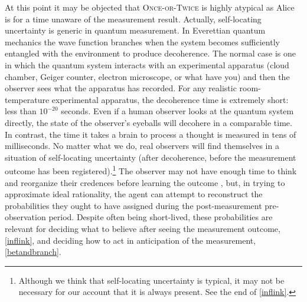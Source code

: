 \documentclass[onecolumn,secnumarabic,amsmath,amssymb,balancelastpage,nofootinbib]{article}
\begin{document}
At this point it may be objected that \textsc{Once-or-Twice} is highly atypical as Alice is for a time unaware of the measurement result.  Actually, self-locating uncertainty is generic in quantum measurement. In Everettian quantum mechanics the wave function branches when the system becomes sufficiently entangled with the environment to produce decoherence.  The normal case is one in which the quantum system interacts with an experimental apparatus (cloud chamber, Geiger counter, electron microscope, or what have you) and then the observer sees what the apparatus has recorded. For any realistic room-temperature experimental apparatus, the decoherence time is extremely short: less than $10^{-20}$ seconds. Even if a human observer looks at the quantum system directly, the state of the observer's eyeballs will decohere in a comparable time. In contrast, the time it takes a brain to process a thought is measured in tens of milliseconds. No matter what we do, real observers will find themselves in a situation of self-locating uncertainty (after decoherence, before the measurement outcome has been registered).\footnote{Although we think that self-locating uncertainty is typical, it may not be necessary for our account that it is always present.  See the end of \textsection \ref{inflink}.}  The observer may not have enough time to think and reorganize their credences before learning the outcome \citep[]{wallace2006}, but, in trying to approximate ideal rationality, the agent can attempt to reconstruct the probabilities they ought to have assigned during the post-measurement pre-observation period.  Despite often being short-lived, these probabilities are relevant for deciding what to believe after seeing the measurement outcome, \textsection \ref{inflink}, and deciding how to act in anticipation of the measurement, \textsection \ref{betandbranch}.
\end{document}
